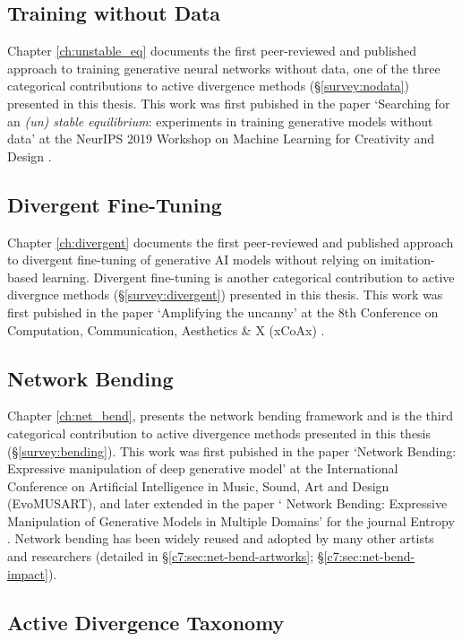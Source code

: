 \subsection{Training without Data}

Chapter \ref{ch:unstable_eq} documents the first peer-reviewed and published approach to training generative neural networks without data, one of the three categorical contributions to active divergence methods (\S \ref{survey:nodata}) presented in this thesis.
This work was first pubished in the paper `Searching for an \textit{(un) stable equilibrium}: experiments in training generative models without data' at the NeurIPS 2019 Workshop on Machine Learning for Creativity and Design \citep{broad2019searching}.

\subsection{Divergent Fine-Tuning}

Chapter \ref{ch:divergent} documents the first peer-reviewed and published approach to divergent fine-tuning of generative AI models without relying on imitation-based learning.
Divergent fine-tuning is another categorical contribution to active divergnce methods (\S \ref{survey:divergent}) presented in this thesis.
This work was first pubished in the paper `Amplifying the uncanny' at the 8th Conference on Computation, Communication, Aesthetics \& X (xCoAx) \citep{broad2020amplifying}.


\subsection{Network Bending}

Chapter \ref{ch:net_bend}, presents the network bending framework and is the third categorical contribution to active divergence methods presented in this thesis (\S \ref{survey:bending}).
This work was first pubished in the paper `Network Bending: Expressive manipulation of deep generative model' at the International Conference on Artificial Intelligence in Music, Sound, Art and Design (EvoMUSART)\citep{broad2020network}, and later extended in the paper ` Network Bending: Expressive Manipulation of Generative Models in Multiple Domains' for the journal Entropy \citep{broad2021network}.
Network bending has been widely reused and adopted by many other artists and researchers (detailed in \S \ref{c7:sec:net-bend-artworks}; \S \ref{c7:sec:net-bend-impact}).

\subsection{Active Divergence Taxonomy}

